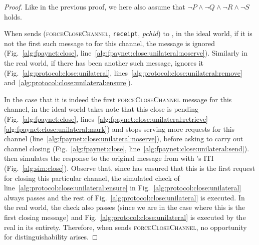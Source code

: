 \begin{proof}
  Like in the previous proof, we here also assume that $\neg P \wedge \neg Q
  \wedge \neg R \wedge \neg S$ holds.

  When \environment{} sends (\textsc{forceCloseChannel}, \texttt{receipt},
  \textit{pchid}) to \alice, in the ideal world, if it is not the first such
  message to \alice{} for this channel, the message is ignored
  (Fig.~\ref{alg:fpaynet:close},
  line~\ref{alg:fpaynet:close:unilateral:noserve}). Similarly in the real world,
  if there has been another such message, \alice{} ignores it
  (Fig.~\ref{alg:protocol:close:unilateral},
  lines~\ref{alg:protocol:close:unilateral:remove}
  and~\ref{alg:protocol:close:unilateral:ensure}).

  In the case that it is indeed the first \textsc{forceCloseChannel} message for
  this channel, in the ideal world \fpaynet{} takes note that this close is
  pending (Fig.~\ref{alg:fpaynet:close},
  lines~\ref{alg:fpaynet:close:unilateral:retrieve}-\ref{alg:fpaynet:close:unilateral:mark})
  and stops serving more requests for this channel
  (line~\ref{alg:fpaynet:close:unilateral:noserve}), before asking \simulator{}
  to carry out channel closing (Fig.~\ref{alg:fpaynet:close},
  line~\ref{alg:fpaynet:close:unilateral:send}). \simulator{} then simulates the
  response to the original message from \environment{} with \alice's ITI
  (Fig.~\ref{alg:sim:close}). Observe that, since \fpaynet{} has ensured that
  this is the first request for closing this particular channel, the simulated
  check of line~\ref{alg:protocol:close:unilateral:ensure} in
  Fig.~\ref{alg:protocol:close:unilateral} always passes and the rest of
  Fig.~\ref{alg:protocol:close:unilateral} is executed. In the real world, the
  check also passes (since we are in the case where this is the first closing
  message) and Fig.~\ref{alg:protocol:close:unilateral} is executed by the real
  \alice{} in its entirety. Therefore, when \environment{} sends
  \textsc{forceCloseChannel}, no opportunity for distinguishability arises.



\end{proof}
